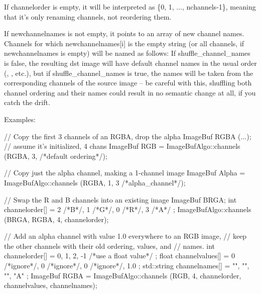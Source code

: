 If {\cf channelorder} is empty, it will be interpreted as
{\cf \{0, 1, ..., nchannels-1\}}, meaning that it's only renaming channels,
not reordering them.

If {\cf newchannelnames} is not empty, it points to an array of new channel
names.  Channels for which {\cf newchannelnames[i]} is the empty string (or
all channels, if {\cf newchannelnames} is empty) will be named as follows:
If {\cf shuffle_channel_names} is {\cf false}, the resulting dst image will have
default channel names in the usual order (, , etc.), but if
{\cf shuffle_channel_names} is {\cf true}, the names will be taken from the
corresponding channels of the source image -- be careful with this,
shuffling both channel ordering and their names could result in no
semantic change at all, if you catch the drift.

\smallskip
\noindent Examples:
\begin{code}
    // Copy the first 3 channels of an RGBA, drop the alpha
    ImageBuf RGBA (...);   // assume it's initialized, 4 chans
    ImageBuf RGB = ImageBufAlgo::channels (RGBA, 3, {} /*default ordering*/);

    // Copy just the alpha channel, making a 1-channel image
    ImageBuf Alpha = ImageBufAlgo::channels (RGBA, 1, 3 /*alpha_channel*/);

    // Swap the R and B channels into an existing image
    ImageBuf BRGA;
    int channelorder[] = { 2 /*B*/, 1 /*G*/, 0 /*R*/, 3 /*A*/ };
    ImageBufAlgo::channels (BRGA, RGBA, 4, channelorder);

    // Add an alpha channel with value 1.0 everywhere to an RGB image,
    // keep the other channels with their old ordering, values, and
    // names.
    int channelorder[] = { 0, 1, 2, -1 /*use a float value*/ };
    float channelvalues[] = { 0 /*ignore*/, 0 /*ignore*/, 0 /*ignore*/, 1.0 };
    std::string channelnames[] = { "", "", "", "A" };
    ImageBuf RGBA = ImageBufAlgo::channels (RGB, 4, channelorder,
                                            channelvalues, channelnames);
\end{code}
\apiend

 

